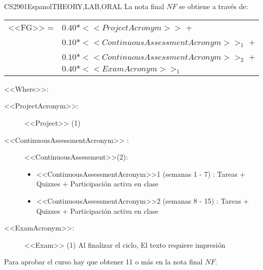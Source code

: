     \begin{evaluation}{CS2901}{Espanol}{THEORY,LAB,ORAL}
    La nota final $NF$ se obtiene a través de:
   
    \begin{tabular}{cl}
        <<FG>> = & $0.40*<<ProjectAcronym>>$ + \\
                 & $0.10*<<ContinuousAssessmentAcronym>>_{1}$ + \\
                 & $0.10*<<ContinuousAssessmentAcronym>>_{2}$ +  \\
                 & $0.40*<<ExamAcronym>>_{1}$
    \end{tabular}
   
    \noindent <<Where>>:
    \begin{description}
       \item[<<ProjectAcronym>>:] <<Project>> (1)
       \item[<<ContinuousAssessmentAcronym>> :] <<ContinuousAssessment>>(2):
        \begin{itemize}
              \item <<ContinuousAssessmentAcronym>>1 (semanas 1 - 7) : Tareas + Quizzes + Participación activa en clase
               \item <<ContinuousAssessmentAcronym>>2 (semanas 8 - 15) : Tareas + Quizzes + Participación activa en clase
         \end{itemize}
       \item[<<ExamAcronym>>:] <<Exam>> (1) Al finalizar el ciclo, El texto requiere impresión
    \end{description}
   
    \noindent Para aprobar el curso hay que obtener 11 o más en la nota final $NF$.
    \end{evaluation}
   
